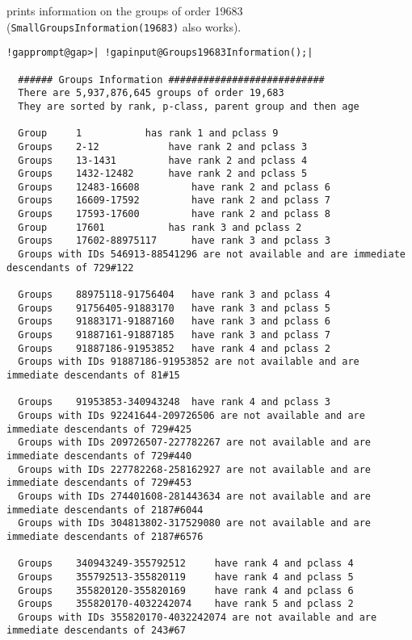 \documentclass[a4paper,11pt]{report}
\begin{document}
{{{ prints information on the groups of order 19683 (\texttt{SmallGroupsInformation(19683)} also works). 
\begin{Verbatim}[commandchars=!@|,fontsize=\small,frame=single,label=Example]
  !gapprompt@gap>| !gapinput@Groups19683Information();|
  
  ###### Groups Information ###########################
  There are 5,937,876,645 groups of order 19,683
  They are sorted by rank, p-class, parent group and then age
  
  Group 	1 			has rank 1 and pclass 9
  Groups 	2-12 			have rank 2 and pclass 3
  Groups 	13-1431 		have rank 2 and pclass 4
  Groups 	1432-12482 		have rank 2 and pclass 5
  Groups 	12483-16608 		have rank 2 and pclass 6
  Groups 	16609-17592 		have rank 2 and pclass 7
  Groups 	17593-17600 		have rank 2 and pclass 8
  Group 	17601 			has rank 3 and pclass 2
  Groups 	17602-88975117 		have rank 3 and pclass 3
  Groups with IDs 546913-88541296 are not available and are immediate descendants of 729#122
  
  Groups 	88975118-91756404 	have rank 3 and pclass 4
  Groups 	91756405-91883170 	have rank 3 and pclass 5
  Groups 	91883171-91887160 	have rank 3 and pclass 6
  Groups 	91887161-91887185 	have rank 3 and pclass 7
  Groups 	91887186-91953852 	have rank 4 and pclass 2
  Groups with IDs 91887186-91953852 are not available and are immediate descendants of 81#15
  
  Groups 	91953853-340943248 	have rank 4 and pclass 3
  Groups with IDs 92241644-209726506 are not available and are immediate descendants of 729#425
  Groups with IDs 209726507-227782267 are not available and are immediate descendants of 729#440
  Groups with IDs 227782268-258162927 are not available and are immediate descendants of 729#453
  Groups with IDs 274401608-281443634 are not available and are immediate descendants of 2187#6044
  Groups with IDs 304813802-317529080 are not available and are immediate descendants of 2187#6576
  
  Groups 	340943249-355792512 	have rank 4 and pclass 4
  Groups 	355792513-355820119 	have rank 4 and pclass 5
  Groups 	355820120-355820169 	have rank 4 and pclass 6
  Groups 	355820170-4032242074 	have rank 5 and pclass 2
  Groups with IDs 355820170-4032242074 are not available and are immediate descendants of 243#67
  

\end{Verbatim}}}}
\end{document}
